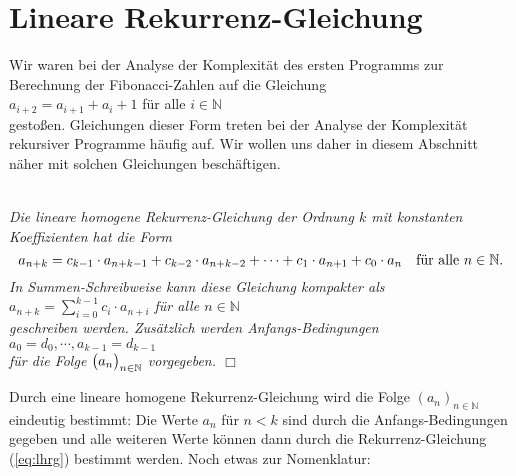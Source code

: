\section{Lineare Rekurrenz-Gleichung \label{sec:lineare-RG}}
Wir waren bei der Analyse der Komplexit\"at des ersten Programms zur Berechnung der
Fibonacci-Zahlen auf die Gleichung \\[0.1cm]
\hspace*{1.3cm} $a_{i+2} = a_{i+1} + {a_i} + 1$ \quad f\"ur alle $i \in \mathbb{N}$ \\[0.1cm]
gesto{\ss}en. Gleichungen dieser Form treten bei der Analyse der Komplexit\"at rekursiver
Programme h\"aufig auf. Wir wollen uns daher in diesem Abschnitt n\"aher mit solchen
Gleichungen besch\"aftigen.

\begin{Definition} \hspace*{\fill} \\
{\em 
  Die \emph{lineare homogene Rekurrenz-Gleichung der Ordnung $k$ mit konstanten Koeffizienten} hat die Form
  \begin{equation}
    \label{eq:lhrg}
  a_{n+k} = c_{k-1} \cdot a_{n+k-1} + c_{k-2} \cdot a_{n+k-2} + \cdots + c_1 \cdot a_{n+1} + c_0 \cdot a_{n}
     \quad \mbox{f\"ur alle $n \in {\mathbb N}$}. 
  \end{equation}
     In Summen-Schreibweise kann diese Gleichung kompakter als 
     \\[0.1cm]
     \hspace*{1.3cm}
     $a_{n+k} = \sum\limits_{i=0}^{k-1} c_i \cdot a_{n+i}$ \quad f\"ur alle $n \in \mathbb{N}$
     \\[0.1cm]
     geschreiben werden.
     Zus\"atzlich werden \emph{Anfangs-Bedingungen}  
      \\[0.1cm]
      \hspace*{1.3cm}      
      $a_0 = d_0, \cdots, a_{k-1} = d_{k-1}$ 
      \\[0.1cm]
      f\"ur die Folge $\bigl(a_n\bigr)_{n\in\mathbb{N}}$ vorgegeben.    
    \hspace*{\fill} $\Box$
}
\end{Definition}
Durch eine lineare homogene Rekurrenz-Gleichung wird die Folge $(a_n)_{n\in\mathbb{N}}$
eindeutig bestimmt: Die Werte $a_n$ f\"ur $n < k$ sind durch die Anfangs-Bedingungen gegeben und
alle weiteren Werte k\"onnen dann durch die Rekurrenz-Gleichung (\ref{eq:lhrg}) bestimmt werden.
Noch  etwas zur Nomenklatur:
